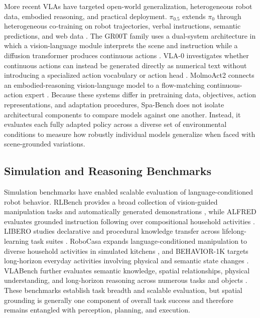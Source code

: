 \documentclass[conference]{IEEEtran}
\begin{document}
More recent VLAs have targeted open-world generalization, heterogeneous robot data, embodied reasoning, and practical deployment. $\pi_{0.5}$ extends $\pi_0$ through heterogeneous co-training on robot trajectories, verbal instructions, semantic predictions, and web data \cite{black2025pi05}. The GR00T family uses a dual-system architecture in which a vision-language module interprets the scene and instruction while a diffusion transformer produces continuous actions \cite{nvidia2025gr00t}. VLA-0 investigates whether continuous actions can instead be generated directly as numerical text without introducing a specialized action vocabulary or action head \cite{goyal2025vla0}. MolmoAct2 connects an embodied-reasoning vision-language model to a flow-matching continuous-action expert \cite{fang2026molmoact2}. Because these systems differ in pretraining data, objectives, action representations, and adaptation procedures, Spa-Bench does not isolate architectural components to compare models against one another. Instead, it evaluates each fully adapted policy across a diverse set of environmental conditions to measure how robustly individual models generalize when faced with scene-grounded variations.

\subsection{Simulation and Reasoning Benchmarks}

Simulation benchmarks have enabled scalable evaluation of language-conditioned robot behavior. RLBench provides a broad collection of vision-guided manipulation tasks and automatically generated demonstrations \cite{james2019rlbench}, while ALFRED evaluates grounded instruction following over compositional household activities \cite{shridhar2019alfred}. LIBERO studies declarative and procedural knowledge transfer across lifelong-learning task suites \cite{liu2023libero}. RoboCasa expands language-conditioned manipulation to diverse household activities in simulated kitchens \cite{nasiriany2024robocasa}, and BEHAVIOR-1K targets long-horizon everyday activities involving physical and semantic state changes \cite{li2024behavior1k}. VLABench further evaluates semantic knowledge, spatial relationships, physical understanding, and long-horizon reasoning across numerous tasks and objects \cite{zhang2024vlabench}. These benchmarks establish task breadth and scalable evaluation, but spatial grounding is generally one component of overall task success and therefore remains entangled with perception, planning, and execution.
\end{document}
